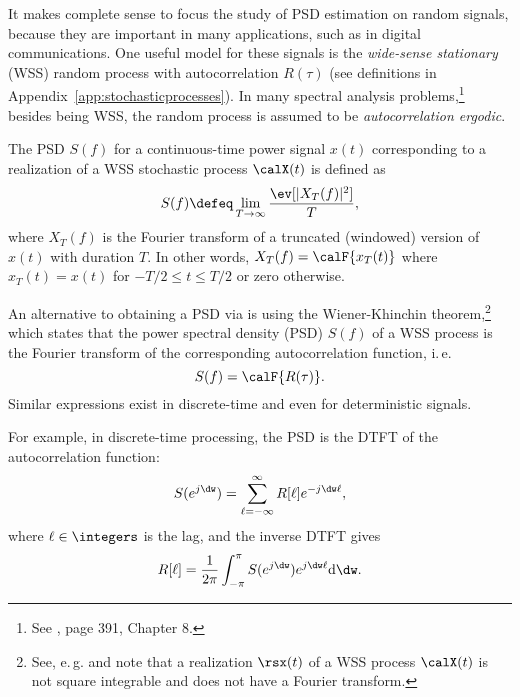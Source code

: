 It makes complete sense to focus the study of PSD estimation on random signals, because they are important in many applications, such as in digital communications. One useful model for these signals is the \emph{wide-sense stationary} (WSS) random process with autocorrelation $R(\tau)$ (see definitions in Appendix~\ref{app:stochasticprocesses}). In many spectral analysis problems,\footnote{See \cite{Hayes2009}, page 391, Chapter 8.} besides being WSS, the random process 
is assumed to be \emph{autocorrelation ergodic}.

The PSD $S(f)$ for a continuous-time power signal $x(t)$ corresponding to a realization of a WSS stochastic process $\calX(t)$ is defined as
\begin{equation}
S(f) \defeq \lim_{T \rightarrow \infty} \frac{\ev[|X_T(f)|^2]}{T},
\label{eq:psd_continuoustime}
\end{equation}
where $X_T(f)$ is the Fourier transform of a truncated (windowed) version of $x(t)$ with duration $T$. In other words, $X_T(f) = \calF \{ x_T(t) \}$ where $x_T(t)=x(t)$ for $-T/2 \le t \le T/2$ or zero otherwise.

An alternative to obtaining a PSD via  is using the Wiener-Khinchin theorem,\footnote{See, e.\,g.  and note that a realization $\rsx(t)$ of a WSS process $\calX(t)$ is not square integrable and does not have a Fourier transform.} %
which states that the power spectral density (PSD) $S(f)$ of a WSS process is the Fourier transform of the corresponding autocorrelation function, i.\,e.
\begin{equation}
S(f) = \calF \{ R(\tau) \}.
\label{eq:auto_psd_continuous}
\end{equation}
Similar expressions exist in discrete-time and even for deterministic signals.

For example, in discrete-time processing, the PSD is the DTFT of the autocorrelation function:
\begin{equation}
S(e^{j \dw}) = \sum_{\ell=-\infty}^\infty R[\ell] e^{-j \dw \ell},
\label{eq:discrete_psd}
\end{equation}
where $\ell \in \integers$ is the lag, and the inverse DTFT gives
\begin{equation}
R[\ell] =  \frac{1}{2 \pi} \int_{-\pi}^{\pi}  S(e^{j \dw}) e^{j \dw \ell} \textrm{d}\dw.
\label{eq:inverse_discrete_psd}
\end{equation}

